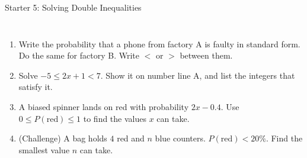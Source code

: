 \documentclass{beamer}
\newcommand{\ashow}[1]{\uncover<2->{\textcolor{red}{\small #1}}}
\newcommand{\tightlist}{%
  \setlength{\itemsep}{0pt}\setlength{\parskip}{0pt}\setlength{\topsep}{0pt}%
}
\begin{document}
\begin{frame}[t]{Starter 5: Solving Double Inequalities}
\begin{columns}[T,onlytextwidth]
\vspace{-1.5em}
\footnotesize
\begin{enumerate}\tightlist
{}
  \item Write the probability that a phone from factory A is faulty in standard form. Do
        the same for factory B. Write $<$ or $>$ between them.
        \ashow{$\tfrac{6}{3000}=2\times10^{-3}\ <\ \tfrac{10}{2000}=5\times10^{-3}$}
  \item Solve $-5\leq2x+1<7$. Show it on number line A, and list the integers that
        satisfy it.
        \ashow{$-3\leq x<3$; \; $-3,\ -2,\ -1,\ 0,\ 1,\ 2$}
  \item A biased spinner lands on red with probability $2x-0.4$. Use
        $0\leq P(\text{red})\leq1$ to find the values $x$ can take.
        \ashow{$0.4\leq2x\leq1.4$, so $0.2\leq x\leq0.7$}
  \item (Challenge) A bag holds $4$ red and $n$ blue counters. $P(\text{red})<20\%$.
        Find the smallest value $n$ can take.
        \ashow{$0.2(4+n)>4$, so $4+n>20$ and $n>16$; \; $n=17$}
\end{enumerate}
\end{columns}
\end{frame}
\end{document}
